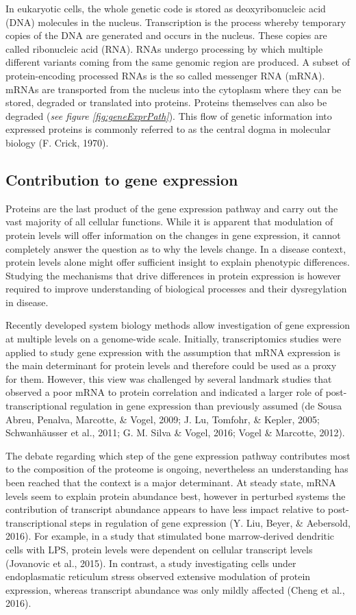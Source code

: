 \documentclass[12pt,openany]{book}
\begin{document}
In eukaryotic cells, the whole genetic code is stored as
deoxyribonucleic acid (DNA) molecules in the nucleus. Transcription is
the process whereby temporary copies of the DNA are generated and occurs
in the nucleus. These copies are called ribonucleic acid (RNA). RNAs
undergo processing by which multiple different variants coming from the
same genomic region are produced. A subset of protein-encoding processed
RNAs is the so called messenger RNA (mRNA). mRNAs are transported from
the nucleus into the cytoplasm where they can be stored, degraded or
translated into proteins. Proteins themselves can also be degraded
(\emph{see figure \ref{fig:geneExprPath}}). This flow of genetic
information into expressed proteins is commonly referred to as the
central dogma in molecular biology (F. Crick, 1970). \clearpage
\subsection{Contribution to gene expression} Proteins are the last
product of the gene expression pathway and carry out the vast majority
of all cellular functions. While it is apparent that modulation of
protein levels will offer information on the changes in gene expression,
it cannot completely answer the question as to why the levels change. In
a disease context, protein levels alone might offer sufficient insight
to explain phenotypic differences. Studying the mechanisms that drive
differences in protein expression is however required to improve
understanding of biological processes and their dysregylation in
disease.

Recently developed system biology methods allow investigation of gene
expression at multiple levels on a genome-wide scale. Initially,
transcriptomics studies were applied to study gene expression with the
assumption that mRNA expression is the main determinant for protein
levels and therefore could be used as a proxy for them. However, this
view was challenged by several landmark studies that observed a poor
mRNA to protein correlation and indicated a larger role of
post-transcriptional regulation in gene expression than previously
assumed (de Sousa Abreu, Penalva, Marcotte, \& Vogel, 2009; J. Lu,
Tomfohr, \& Kepler, 2005; Schwanhäusser et al., 2011; G. M. Silva \&
Vogel, 2016; Vogel \& Marcotte, 2012).

The debate regarding which step of the gene expression pathway
contributes most to the composition of the proteome is ongoing,
nevertheless an understanding has been reached that the context is a
major determinant. At steady state, mRNA levels seem to explain protein
abundance best, however in perturbed systems the contribution of
transcript abundance appears to have less impact relative to
post-transcriptional steps in regulation of gene expression (Y. Liu,
Beyer, \& Aebersold, 2016). For example, in a study that stimulated bone
marrow-derived dendritic cells with LPS, protein levels were dependent
on cellular transcript levels (Jovanovic et al., 2015). In contrast, a
study investigating cells under endoplasmatic reticulum stress observed
extensive modulation of protein expression, whereas transcript abundance
was only mildly affected (Cheng et al., 2016).
\end{document}
